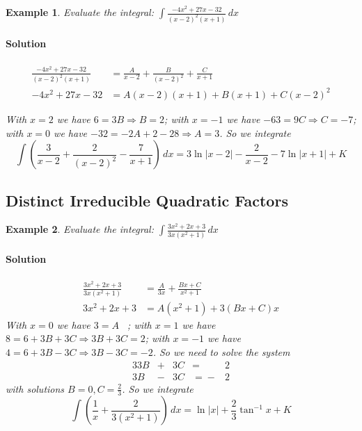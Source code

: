 \documentclass[letterpaper, 11pt, openany]{book}
\theoremstyle{mytheoremstyle}
\theoremstyle{myexamplestyle}
\newtheorem{example}{Example}[section]
\newenvironment{solution}{\paragraph{\sffamily \smaller \fontseries{b}\selectfont Solution}}{\hfill\faSquare}
\begin{document}
\begin{example}\label{e:parfracreplin2}    
    Evaluate the integral: $\displaystyle \int \frac{-4x^{2} + 27x - 32}{(x - 2)^{2} (x + 1)} \, dx$
    
    \begin{solution}
        \begin{align*}
            \frac{-4x^{2} + 27x - 32}{(x - 2)^{2} (x + 1)} &= \frac{A}{x-2} + \frac{B}{(x-2)^{2}} + \frac{C}{x + 1}\\[2ex]
            -4x^{2} + 27x - 32 & = A(x - 2)(x + 1) + B(x + 1) + C(x-2)^{2}
        \end{align*}
    
    With $x = 2$ we have $6 = 3B \Rightarrow B = 2$; with $x = -1$ we have $-63 = 9C \Rightarrow C = -7$; with $x = 0$ we have $-32 = -2A + 2 - 28 \Rightarrow A = 3$. So we integrate
    \[\int \left( \frac{3}{x-2} + \frac{2}{(x-2)^{2}} - \frac{7}{x + 1} \right)\, dx = 3\ln |x - 2| - \frac{2}{x - 2} - 7\ln |x + 1| + K\]
    \end{solution}
\end{example}

\subsection{Distinct Irreducible Quadratic Factors}
\begin{example}\label{e:parfracdirred}
    Evaluate the integral: $\displaystyle \int \frac{3x^{2} + 2x + 3}{3x\left( x^{2} + 1 \right)} \, dx$
    
    \begin{solution}
        \begin{align*}
            \frac{3x^{2} + 2x + 3}{3x\left( x^{2} + 1 \right)} &= \frac{A}{3x} + \frac{Bx + C}{x^{2} + 1}\\[2ex]
            3x^{2} + 2x + 3 &= A(x^{2} + 1) + 3(Bx + C)x
        \end{align*}
        With $x = 0$ we have $3 = A$ \faSmile \ ; with $x = 1$ we have $8 = 6 + 3B + 3C \Rightarrow 3B + 3C = 2$; with $x = -1$ we have $4 = 6 + 3B - 3C \Rightarrow 3B - 3C = -2$. So we need to solve the system    
        \begin{alignat*}{3}
            3B & {}+{} & 3C & {}={} &2 \\
            3B & {}-{} & 3C & {}={} -&2
        \end{alignat*}
        with solutions $B = 0, C = \frac{2}{3}$. So we integrate
        \[\int \left( \frac{1}{x} + \frac{2}{3(x^{2} + 1)} \right) \, dx = \ln |x| + \frac{2}{3} \tan^{-1}x  + K\]
    \end{solution}
\end{example}
\end{document}
